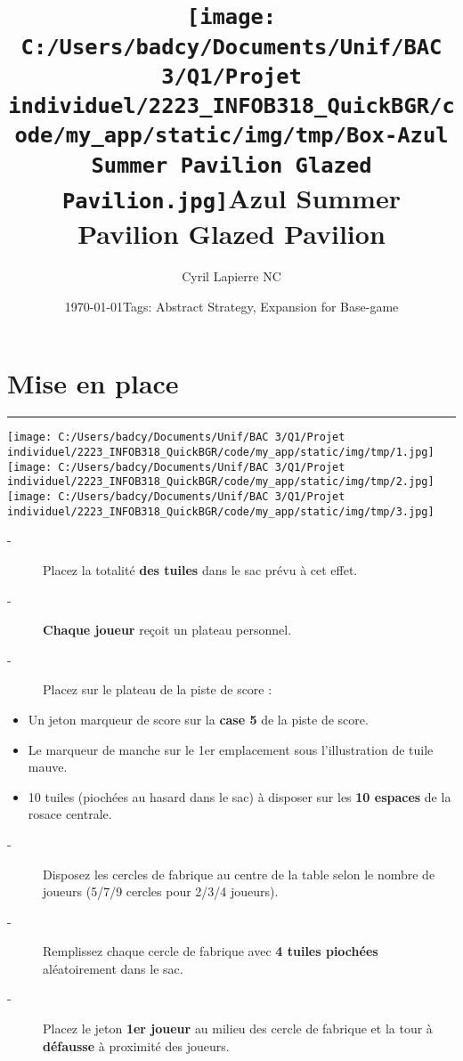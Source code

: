 \documentclass{scrartcl}%
\title{\texttt{[image: C:/Users/badcy/Documents/Unif/BAC 3/Q1/Projet individuel/2223\_INFOB318\_QuickBGR/code/my\_app/static/img/tmp/Box-Azul Summer Pavilion Glazed Pavilion.jpg]}\break Azul Summer Pavilion Glazed Pavilion }%
\author{Cyril Lapierre NC}%
\date{\today \break Tags: Abstract Strategy, Expansion for Base-game}%
\begin{document}
%
\normalsize%
\maketitle\thispagestyle{header}%
\pagestyle{header}%
\section{ Mise en place
}%
\label{sec:Miseenplace}%
\rule{18cm}{0.07cm}\break%
%
\texttt{[image: C:/Users/badcy/Documents/Unif/BAC 3/Q1/Projet individuel/2223\_INFOB318\_QuickBGR/code/my\_app/static/img/tmp/1.jpg]}%
\texttt{[image: C:/Users/badcy/Documents/Unif/BAC 3/Q1/Projet individuel/2223\_INFOB318\_QuickBGR/code/my\_app/static/img/tmp/2.jpg]}%
\texttt{[image: C:/Users/badcy/Documents/Unif/BAC 3/Q1/Projet individuel/2223\_INFOB318\_QuickBGR/code/my\_app/static/img/tmp/3.jpg]}%

%
\begin{description}%
\item[{-} ]%
%
 Placez la totalité %
\textbf{des tuiles}%
\textit{ }%
 dans le sac prévu à cet effet.
%
\item[{-} ]%
%
\textbf{Chaque joueur}%
\textit{ }%
 reçoit un plateau personnel.
%
\item[{-} ]%
%
 Placez sur le plateau de la piste de score :
%
\end{description}%
\begin{itemize}%
\item%
%
 Un jeton marqueur de score sur la %
\textbf{case 5}%
\textit{ }%
 de la piste de score.
%
\item%
%
 Le marqueur de manche sur le 1er emplacement sous l’illustration de tuile mauve.
%
\item%
%
 10 tuiles (piochées au hasard dans le sac) à disposer sur les %
\textbf{10 espaces}%
\textit{ }%
 de la rosace centrale.
%
\end{itemize}%
\begin{description}%
\item[{-} ]%
%
 Disposez les cercles de fabrique au centre de la table selon le nombre de joueurs (5/7/9 cercles pour 2/3/4 joueurs).
%
\item[{-} ]%
%
 Remplissez chaque cercle de fabrique avec %
\textbf{4 tuiles piochées}%
\textit{ }%
 aléatoirement dans le sac.
%
\item[{-} ]%
%
 Placez le jeton %
\textbf{1er joueur}%
\textit{ }%
 au milieu des cercle de fabrique et la tour à %
\textbf{défausse}%
\textit{ }%
 à proximité des joueurs.
%
\end{description}
\end{document}
